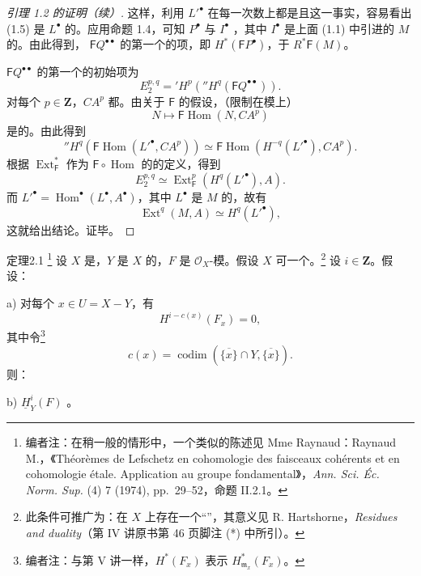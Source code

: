 \begin{proof}[引理 1.2 的证明（续）]
这样，利用 $L'^{\bullet}$ 在每一次数上都是且这一事实，容易看出 (1.5) 是 $L^{\bullet}$ 的。应用命题 1.4，可知 $P^{\bullet}$ 与 $I^{\bullet}$ ，其中 $I^{\bullet}$ 是上面 (1.1) 中引进的 $M$ 的。由此得到， $\mathsf FQ^{\bullet\bullet}$ 的第一个的项，即 $H^*(\mathsf FP^{\bullet})$，于 $R^*\mathsf F(M)$。

 $\mathsf FQ^{\bullet\bullet}$ 的第一个的初始项为
\[E^{p,q}_2={}'H^p({}''H^q(\mathsf FQ^{\bullet\bullet})).\]
对每个 $p\in\mathbf Z$，$CA^p$ 都。由关于 $\mathsf F$ 的假设，（限制在模上）
\[N\longmapsto\mathsf F\operatorname{Hom}(N,CA^p)\]
是的。由此得到
\[{}''H^q(\mathsf F\operatorname{Hom}(L'^{\bullet},CA^p))
\simeq\mathsf F\operatorname{Hom}(H^{-q}(L'^{\bullet}),CA^p).\]
根据 $\operatorname{Ext}^*_{\mathsf F}$ 作为 $\mathsf F\circ\operatorname{Hom}$ 的的定义，得到
\[E^{p,q}_2\simeq\operatorname{Ext}^p_{\mathsf F}(H^q(L'^{\bullet}),A).\]
而 $L'^{\bullet}=\operatorname{Hom}^{\bullet}(L^{\bullet},A^{\bullet})$，其中 $L^{\bullet}$ 是 $M$ 的，故有
\[\operatorname{Ext}^q(M,A)\simeq H^q(L'^{\bullet}),\]
这就给出结论。证毕。
\end{proof}
\begin{SGAresult}{定理}{2.1}
\footnote{编者注：在稍一般的情形中，一个类似的陈述见 Mme Raynaud：Raynaud M.，《Théorèmes de Lefschetz en cohomologie des faisceaux cohérents et en cohomologie étale. Application au groupe fondamental》，\emph{Ann. Sci. Éc. Norm. Sup.} (4) 7 (1974), pp.~29--52，命题 II.2.1。}
设 $X$ 是，$Y$ 是 $X$ 的，$F$ 是 $\mathscr O_X$-模。假设 $X$ 可一个。\footnote{此条件可推广为：在 $X$ 上存在一个“”，其意义见 R. Hartshorne，\emph{Residues and duality}（第 IV 讲原书第 46 页脚注 (*) 中所引）。}
设 $i\in\mathbf Z$。假设：

 a) 对每个 $x\in U=X-Y$，有
\[H^{i-c(x)}(F_x)=0,\]
其中令\footnote{编者注：与第 V 讲一样，$H^*(F_x)$ 表示 $H^*_{\mathfrak m_x}(F_x)$。}
\[c(x)=\operatorname{codim}(\overline{\{x\}}\cap Y,\overline{\{x\}}).\tag{2.1}\]
则：

 b) $\underline H^i_Y(F)$ 。
\end{SGAresult}
